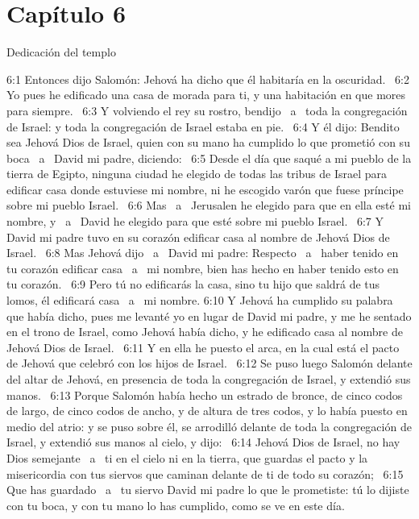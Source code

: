 					\section*{Capítulo 6}
						Dedicación del templo  
						
						
						6:1 Entonces dijo Salomón: Jehová ha dicho que él habitaría en la oscuridad.  
						6:2 Yo pues he edificado una casa de morada para ti, y una habitación en que mores para siempre.  
						6:3 Y volviendo el rey su rostro, bendijo  a  toda la congregación de Israel: y toda la congregación de Israel estaba en pie.  
						6:4 Y él dijo: Bendito sea Jehová Dios de Israel, quien con su mano ha cumplido lo que prometió con su boca  a  David mi padre, diciendo:  
						6:5 Desde el día que saqué a mi pueblo de la tierra de Egipto, ninguna ciudad he elegido de todas las tribus de Israel para edificar casa donde estuviese mi nombre, ni he escogido varón que fuese príncipe sobre mi pueblo Israel.  
						6:6 Mas  a  Jerusalen he elegido para que en ella esté mi nombre, y  a  David he elegido para que esté sobre mi pueblo Israel.  
						6:7 Y David mi padre tuvo en su corazón edificar casa al nombre de Jehová Dios de Israel.  
						6:8 Mas Jehová dijo  a  David mi padre: Respecto  a  haber tenido en tu corazón edificar casa  a  mi nombre, bien has hecho en haber tenido esto en tu corazón.  
						6:9 Pero tú no edificarás la casa, sino tu hijo que saldrá de tus lomos, él edificará casa  a  mi nombre. 
						6:10 Y Jehová ha cumplido su palabra que había dicho, pues me levanté yo en lugar de David mi padre, y me he sentado en el trono de Israel, como Jehová había dicho, y he edificado casa al nombre de Jehová Dios de Israel.  
						6:11 Y en ella he puesto el arca, en la cual está el pacto de Jehová que celebró con los hijos de Israel.  
						6:12 Se puso luego Salomón delante del altar de Jehová, en presencia de toda la congregación de Israel, y extendió sus manos.  
						6:13 Porque Salomón había hecho un estrado de bronce, de cinco codos  de largo, de cinco codos de ancho, y de altura de tres codos, y lo había puesto en medio del atrio: y se puso sobre él, se arrodilló delante de toda la congregación de Israel, y extendió sus manos al cielo, y dijo:  
						6:14 Jehová Dios de Israel, no hay Dios semejante  a  ti en el cielo ni en la tierra, que guardas el pacto y la misericordia con tus siervos que caminan delante de ti de todo su corazón;  
						6:15 Que has guardado  a  tu siervo David mi padre lo que le prometiste: tú lo dijiste con tu boca, y con tu mano lo has cumplido, como se ve en este día.  
